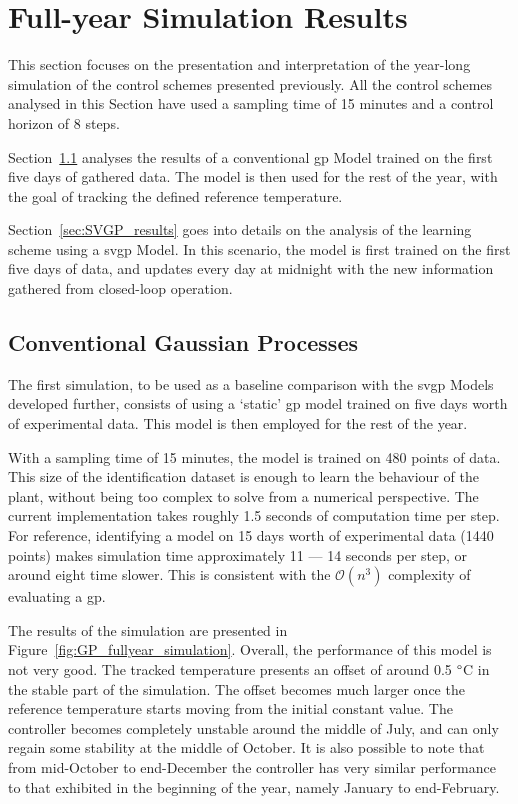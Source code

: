 \section{Full-year Simulation Results}\label{sec:results}


This section focuses on the presentation and interpretation of the year-long
simulation of the control schemes presented previously. All the control schemes
analysed in this Section have used a sampling time of 15 minutes and a control
horizon of 8 steps.

Section~\ref{sec:GP_results} analyses the results of a conventional
\acrlong{gp} Model trained on the first five days of gathered data. The model
is then used for the rest of the year, with the goal of tracking the defined
reference temperature.

Section~\ref{sec:SVGP_results} goes into details on the analysis of the learning
scheme using a \acrshort{svgp} Model. In this scenario, the model is first
trained on the first five days of data, and updates every day at midnight with
the new information gathered from closed-loop operation.

\subsection{Conventional Gaussian Processes}\label{sec:GP_results}

The first simulation, to be used as a baseline comparison with the
\acrshort{svgp} Models developed further, consists of using a `static'
\acrshort{gp} model trained on five days worth of experimental data. This model
is then employed for the rest of the year.

With a sampling time of 15 minutes, the model is trained on 480 points of data.
This size of the identification dataset is enough to learn the behaviour of the
plant, without being too complex to solve from a numerical perspective. The
current implementation takes roughly 1.5 seconds of computation time per step.
For reference, identifying a model on 15 days worth of experimental data (1440
points) makes simulation time approximately 11 --- 14 seconds per step, or
around eight time slower. This is consistent with the $\mathcal{O}(n^3)$
complexity of evaluating a \acrshort{gp}.

The results of the simulation are presented in
Figure~\ref{fig:GP_fullyear_simulation}. Overall, the performance of this model
is not very good. The tracked temperature presents an offset of around 0.5
$\degree$C in the stable part of the simulation. The offset becomes much larger
once the reference temperature starts moving from the initial constant value.
The controller becomes completely unstable around the middle of July, and can
only regain some stability at the middle of October. It is also possible to note
that from mid-October to end-December the controller has very similar
performance to that exhibited in the beginning of the year, namely January to
end-February.

